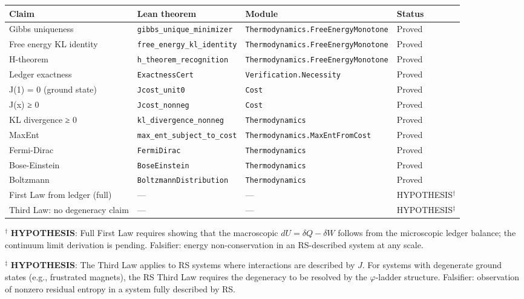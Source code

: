 \documentclass[12pt,a4paper]{article}
\theoremstyle{definition}
\theoremstyle{remark}
\begin{document}
\begin{center}
\begin{tabular}{llll}
\toprule
Claim & Lean theorem & Module & Status \\
\midrule
Gibbs uniqueness & \texttt{gibbs\_unique\_minimizer} & \texttt{Thermodynamics.FreeEnergyMonotone} & Proved \\
Free energy KL identity & \texttt{free\_energy\_kl\_identity} & \texttt{Thermodynamics.FreeEnergyMonotone} & Proved \\
H-theorem & \texttt{h\_theorem\_recognition} & \texttt{Thermodynamics.FreeEnergyMonotone} & Proved \\
Ledger exactness & \texttt{ExactnessCert} & \texttt{Verification.Necessity} & Proved \\
J(1) = 0 (ground state) & \texttt{Jcost\_unit0} & \texttt{Cost} & Proved \\
J(x) ≥ 0 & \texttt{Jcost\_nonneg} & \texttt{Cost} & Proved \\
KL divergence ≥ 0 & \texttt{kl\_divergence\_nonneg} & \texttt{Thermodynamics} & Proved \\
MaxEnt & \texttt{max\_ent\_subject\_to\_cost} & \texttt{Thermodynamics.MaxEntFromCost} & Proved \\
Fermi-Dirac & \texttt{FermiDirac} & \texttt{Thermodynamics} & Proved \\
Bose-Einstein & \texttt{BoseEinstein} & \texttt{Thermodynamics} & Proved \\
Boltzmann & \texttt{BoltzmannDistribution} & \texttt{Thermodynamics} & Proved \\
\midrule
First Law from ledger (full) & --- & --- & HYPOTHESIS$^\dagger$ \\
Third Law: no degeneracy claim & --- & --- & HYPOTHESIS$^\ddagger$ \\
\bottomrule
\end{tabular}
\end{center}

$^\dagger$ \textbf{HYPOTHESIS}: Full First Law requires showing that the macroscopic
$dU = \delta Q - \delta W$ follows from the microscopic ledger balance; the
continuum limit derivation is pending. Falsifier: energy non-conservation in
an RS-described system at any scale.

$^\ddagger$ \textbf{HYPOTHESIS}: The Third Law applies to RS systems where
interactions are described by $J$. For systems with degenerate ground states
(e.g., frustrated magnets), the RS Third Law requires the degeneracy to be
resolved by the $\varphi$-ladder structure. Falsifier: observation of nonzero
residual entropy in a system fully described by RS.
\end{document}
